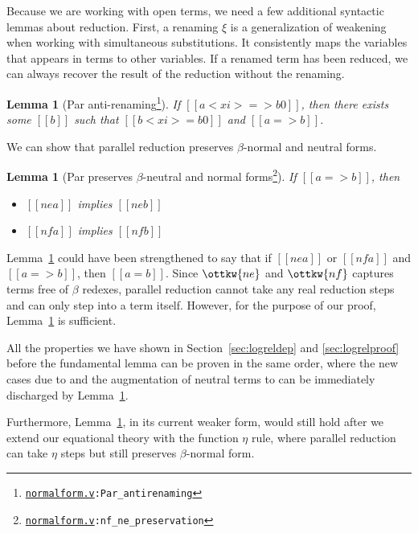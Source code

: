 \documentclass[\ifpublic nolinenum\else\fi,online,OA]{jfp}
\newcommand{\scw}[1]{}
\newcommand{\yl}[1]{}
\newcommand{\dotv}[2]{\href{#1}{\texttt{#1}}{\texttt{:#2}}}
\newtheorem{lemma}[theorem]{Lemma}
\theoremstyle{definition}
\begin{document}
Because we are working with open terms, we need a few additional syntactic
lemmas about reduction. First, a renaming $\xi$ is a generalization of
weakening when working with simultaneous substitutions. It consistently maps the
variables that appears in terms to other variables. If a renamed term has been reduced, we can
always recover the result of the reduction without the renaming.
%
\scw{This lemma is only used to prove \texttt{wn\_antirenaming}, which is then
used more generally. Maybe we should replace it with
that?}\yl{Anti-renaming is mentioned once in Section 6 when we talk abou how confluence with $\eta$
depends on anti-renaming for Par. I don't think that discussion in
Section 6 is very important so I'm fine with replacing it  }
\begin{lemma}[Par anti-renaming\footnote{\dotv{normalform.v}{Par\_antirenaming}}]
  \label{lemma:parantirenaming} If $[[a < xi > => b0]]$, then there
exists some $[[b]]$ such that $[[b < xi > = b0]]$ and $[[a => b]]$.
\end{lemma}

We can show that parallel reduction preserves $\beta$-normal and
neutral forms.
\begin{lemma}[Par preserves $\beta$-neutral and normal forms\footnote{\dotv{normalform.v}{nf\_ne\_preservation}}]
  \label{lemma:parnenf}
  If $[[a => b]]$, then
  \begin{itemize}
  \item $[[ne a]]$ implies $[[ne b]]$
  \item $[[nf a]]$ implies $[[nf b]]$
  \end{itemize}
\end{lemma}
Lemma~\ref{lemma:parnenf} could have been strengthened to say that if
$[[ne a]]$ or $[[nf a]]$ and $[[a => b]]$, then $[[a = b]]$. Since
$\ottkw{ne}$ and $\ottkw{nf}$ captures terms free of $\beta$ redexes, parallel
reduction cannot take any real reduction steps and can only step into a term
itself. However, for the purpose of our proof, Lemma~\ref{lemma:parnenf} is
sufficient.

All the properties we have shown in
Section~\ref{sec:logreldep} and \ref{sec:logrelproof} before the fundamental
lemma can be proven in the same order, where the new cases due to 
and the augmentation of neutral terms to  can be
immediately discharged by Lemma~\ref{lemma:parnenf}.

Furthermore, Lemma~\ref{lemma:parnenf}, in its current weaker form, would
still hold after we extend our equational theory with the function $\eta$
rule, where parallel reduction can take $\eta$ steps but still preserves
$\beta$-normal form.
\end{document}
